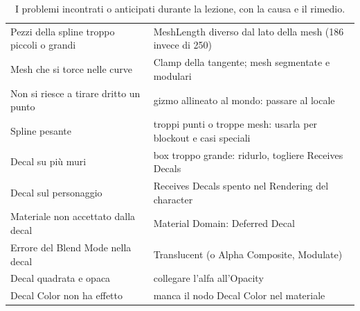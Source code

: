 \begin{table}[htbp]
\begin{tabular}{@{}p{5.4cm}p{8.6cm}@{}}
Pezzi della spline troppo piccoli o grandi & MeshLength diverso dal lato della mesh (186
invece di 250) \\
Mesh che si torce nelle curve & Clamp della tangente; mesh segmentate e modulari \\
Non si riesce a tirare dritto un punto & gizmo allineato al mondo: passare al locale \\
Spline pesante & troppi punti o troppe mesh: usarla per blockout e casi speciali \\
Decal su più muri & box troppo grande: ridurlo, togliere Receives Decals \\
Decal sul personaggio & Receives Decals spento nel Rendering del character \\
Materiale non accettato dalla decal & Material Domain: Deferred Decal \\
Errore del Blend Mode nella decal & Translucent (o Alpha Composite, Modulate) \\
Decal quadrata e opaca & collegare l'alfa all'Opacity \\
Decal Color non ha effetto & manca il nodo Decal Color nel materiale \\
\bottomrule
\end{tabular}
\caption{I problemi incontrati o anticipati durante la lezione, con la causa e il rimedio.}
\label{ue16:tab:errori}
\end{table}

